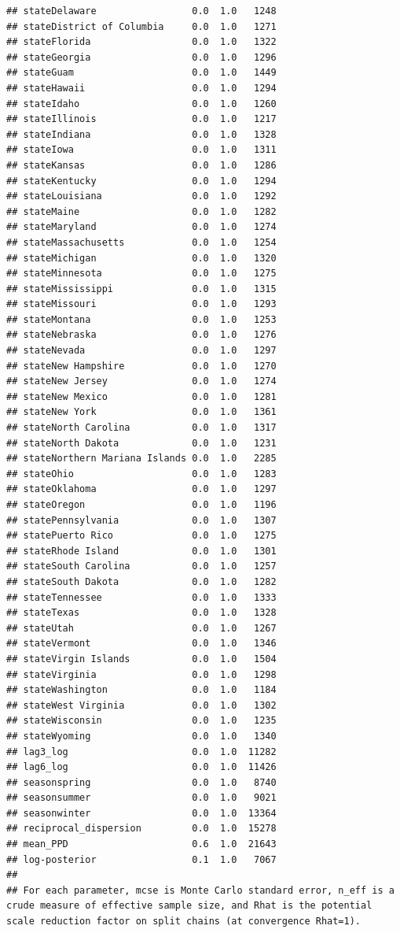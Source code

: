 \documentclass[
]{book}
\begin{document}
\begin{verbatim}
## stateDelaware                 0.0  1.0   1248
## stateDistrict of Columbia     0.0  1.0   1271
## stateFlorida                  0.0  1.0   1322
## stateGeorgia                  0.0  1.0   1296
## stateGuam                     0.0  1.0   1449
## stateHawaii                   0.0  1.0   1294
## stateIdaho                    0.0  1.0   1260
## stateIllinois                 0.0  1.0   1217
## stateIndiana                  0.0  1.0   1328
## stateIowa                     0.0  1.0   1311
## stateKansas                   0.0  1.0   1286
## stateKentucky                 0.0  1.0   1294
## stateLouisiana                0.0  1.0   1292
## stateMaine                    0.0  1.0   1282
## stateMaryland                 0.0  1.0   1274
## stateMassachusetts            0.0  1.0   1254
## stateMichigan                 0.0  1.0   1320
## stateMinnesota                0.0  1.0   1275
## stateMississippi              0.0  1.0   1315
## stateMissouri                 0.0  1.0   1293
## stateMontana                  0.0  1.0   1253
## stateNebraska                 0.0  1.0   1276
## stateNevada                   0.0  1.0   1297
## stateNew Hampshire            0.0  1.0   1270
## stateNew Jersey               0.0  1.0   1274
## stateNew Mexico               0.0  1.0   1281
## stateNew York                 0.0  1.0   1361
## stateNorth Carolina           0.0  1.0   1317
## stateNorth Dakota             0.0  1.0   1231
## stateNorthern Mariana Islands 0.0  1.0   2285
## stateOhio                     0.0  1.0   1283
## stateOklahoma                 0.0  1.0   1297
## stateOregon                   0.0  1.0   1196
## statePennsylvania             0.0  1.0   1307
## statePuerto Rico              0.0  1.0   1275
## stateRhode Island             0.0  1.0   1301
## stateSouth Carolina           0.0  1.0   1257
## stateSouth Dakota             0.0  1.0   1282
## stateTennessee                0.0  1.0   1333
## stateTexas                    0.0  1.0   1328
## stateUtah                     0.0  1.0   1267
## stateVermont                  0.0  1.0   1346
## stateVirgin Islands           0.0  1.0   1504
## stateVirginia                 0.0  1.0   1298
## stateWashington               0.0  1.0   1184
## stateWest Virginia            0.0  1.0   1302
## stateWisconsin                0.0  1.0   1235
## stateWyoming                  0.0  1.0   1340
## lag3_log                      0.0  1.0  11282
## lag6_log                      0.0  1.0  11426
## seasonspring                  0.0  1.0   8740
## seasonsummer                  0.0  1.0   9021
## seasonwinter                  0.0  1.0  13364
## reciprocal_dispersion         0.0  1.0  15278
## mean_PPD                      0.6  1.0  21643
## log-posterior                 0.1  1.0   7067
## 
## For each parameter, mcse is Monte Carlo standard error, n_eff is a crude measure of effective sample size, and Rhat is the potential scale reduction factor on split chains (at convergence Rhat=1).
\end{verbatim}
\end{document}
